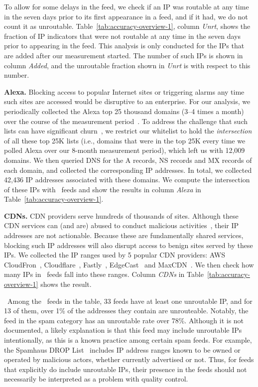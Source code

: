 To allow for some delays in the feed, we check if an IP was routable
at any time in the seven days prior to its first appearance in a feed,
and if it had, we do not count it as
unroutable. Table~\ref{tab:accuracy-overview-1}, column \textit{Unrt},
shows the fraction of IP indicators that were not routable at any time
in the seven days prior to appearing in the feed. This analysis is
only conducted for the IPs that are added after our measurement
started. The number of such IPs is shown in column \textit{Added}, and
the unroutable fraction shown in \textit{Unrt} is with respect to this
number.

\noindent\textbf{Alexa.} Blocking access to popular Internet sites or
triggering alarms any time such sites are accessed would be disruptive
to an enterprise. For our analysis, we periodically collected the
Alexa top 25 thousand domains (3--4 times a month) over the course of
the measurement period~\cite{alexa}. To address the challenge that
such lists can have significant churn~\cite{scheitle2018long}, we
restrict our whitelist to hold the \emph{intersection} of all these
top 25K lists (i.e., domains that were in the top 25K every time we
polled Alexa over our 8-month measurement period), which left us with
12,009 domains.   We then queried DNS for the A records, NS
records and MX records of each domain, and collected the corresponding
IP addresses. In total, we collected 42,436 IP addresses associated
with these domains. We compute the intersection of these IPs
with \ti\ feeds and show the results in column \textit{Alexa} in
Table~\ref{tab:accuracy-overview-1}.


\noindent\textbf{CDNs.} CDN providers serve hundreds of thousands of
sites. Although these CDN services can (and are) abused to conduct
malicious activities~\cite{cdnabuse}, their IP addresses are not
actionable.  Because these are fundamentally shared services,
blocking such IP addresses will also disrupt access to benign
sites served by these IPs.  We collected the IP ranges used by 5
popular CDN providers: AWS CloudFron~\cite{cloudfront},
Cloudflare~\cite{cloudflare}, Fastly~\cite{fastly},
EdgeCast~\cite{edgecast} and MaxCDN~\cite{maxcdn}. We then check how
many IPs in \ti\ feeds fall into these ranges. Column \textit{CDNs} in
Table~\ref{tab:accuracy-overview-1} shows the result.

\finding\ Among the \numipfeeds\ feeds in the table, 33 feeds have at
least one unroutable IP, and for 13 of them, over 1\% of the addresses
they contain are unrouteable. Notably, the {\feedetiprep} feed in the
spam category has an unroutable rate over 78\%.  Although it is not
documented, a likely explanation is that this feed may include unroutable
IPs intentionally, as this is a known practice among certain spam
feeds. For example, the Spamhaus DROP List~\cite{Spamhaus} includes IP
address ranges known to be owned or operated by malicious actors,
whether currently advertised or not. Thus, for feeds that explicitly
do include unroutable IPs, their presence in the feeds should not
necessarily be interpreted as a problem with quality control.

